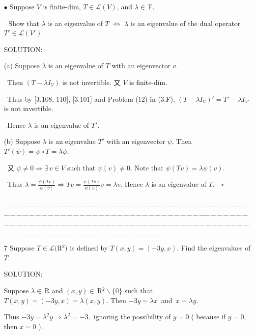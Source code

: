 \documentclass[a4paper, 11pt, UTF8]{article}
\def\Lm{\mathcal{L}}
\def\Rbf{$\,{\timesbf R}\,$}
\def\Fbfc{$\,{\timesbf F}$}
\def\Rbfc{$\,{\timesbf R}$}
\begin{document}
\begin{large}
{\small $\bullet$} {\timessl\Large
Suppose $V$ is finite-dim, $T\in\Lm(V)$, and $\lambda\in\Fbfc.$
}\par\,\,
{\timessl\Large Show that $\lambda$ is an eigenvalue of $T$ $\Longleftrightarrow$ $\lambda$ is an eigenvalue of the dual operator $T'\in\Lm(V')$. 
}\par
{\timesbf S\footnotesize{OLUTION:}}\par\quad
(a) Suppose $\lambda$ is an eigenvalue of $T$ with an eigenvector $v$.\par\qquad\,
Then $(T-\lambda I_V)$ is not invertible. 又 $V$ is finite-dim.\par\qquad\,
Thus by [3.108, 110], [3.101] and Problem (12) in (3.F), $(T-\lambda I_V)'=T'-\lambda I_{V'}$ is not invertible.\par\qquad\,
Hence $\lambda$ is an eigenvalue of $T'.$\par\quad
(b) Suppose $\lambda$ is an eigenvalue $T'$ with an eigenvector $\psi.$ Then $T'(\psi)=\psi\circ T=\lambda\psi.$\par\qquad\,
又 $\psi\neq 0\Rightarrow\exists\,v\in V$ such that $\psi(v)\neq 0.$ Note that $\psi(Tv)=\lambda\psi(v).$\par\qquad\,
Thus $\lambda=\displaystyle\frac{\psi(Tv)}{\psi(v)}\Rightarrow Tv=\frac{\psi(Tv)}{\psi(v)}v=\lambda v.$
Hence $\lambda$ is an eigenvalue of $T.\quad\square$\par
{\tiny \_\,\_\,\_\,\_\,\_\,\_\,\_\,\_\,\_\,\_\,\_\,\_\,\_\,\_\,\_\,\_\,\_\,\_\,\_\,\_\,\_\,\_\,\_\,\_\,\_\,\_\,\_\,\_\,\_\,\_\,\_\,\_\,\_\,\_\,\_\,\_\,\_\,\_\,\_\,\_\,\_\,\_\,\_\,\_\,\_\,\_\,\_\,\_\,\_\,\_\,\_\,\_\,\_\,\_\,\_\,\_\,\_\,\_\,\_\,\_\,\_\,\_\,\_\,\_\,\_\,\_\,\_\,\_\,\_\,\_\,\_\_\,\_\,\_\,\_\,\_\,\_\,\_\,\_\,\_\,\_\,\_\,\_\,\_\,\_\,\_\,\_\,\_\,\_\,\_\,\_\,\_\,\_\,\_\,\_\,\_\,\_\,\_\,\_\,\_\,\_\,\_\,\_\,\_\,\_\,\_\,\_\,\_\,\_\,\_\,\_\,\_\,\_\,\_\,\_\,\_\,\_\,\_\,\_\,\_\,\_\,\_\,\_\,\_\,\_\,\_\,\_\,\_\,\_\,\_\,\_\,\_\,\_\,\_\,\_\,\_\,\_\,\_\,\_\,\_\,\_\,\_}\par
{\timesbf\Large 7} {\timessl\Large 
Suppose $T\in\Lm(${\timesbf R}$^2)$ is defined by $T(x, y) = (-3y, x)$. Find the eigenvalues of $T$.
}\par
{\timesbf S\footnotesize{OLUTION:}}\par\quad
Suppose $\lambda\in\Rbf\,$and $(x,y)\in\Rbfc^2\backslash\{0\}$ such that $T(x,y)=(-3y,x)=\lambda (x,y).$ Then $-3y=\lambda x$ \,{\small and}\, $x=\lambda y.$\par\quad
Thus $-3y=\lambda^2 y\Rightarrow \lambda^2=-3,$ ignoring the possibility of $y=0$ ( because if $y=0,$ then $x=0$ ).\par\quad

\end{large}
\end{document}

